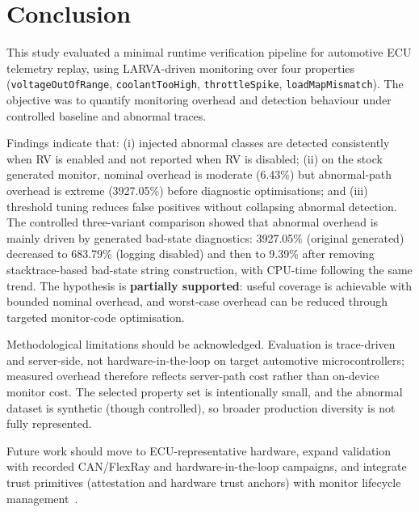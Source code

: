 \section{Conclusion}
\label{sec:Con}

This study evaluated a minimal runtime verification pipeline for automotive ECU telemetry replay, using LARVA-driven monitoring over four properties (\texttt{voltageOutOfRange}, \texttt{coolantTooHigh}, \texttt{throttleSpike}, \texttt{loadMapMismatch}). The objective was to quantify monitoring overhead and detection behaviour under controlled baseline and abnormal traces.

Findings indicate that: (i) injected abnormal classes are detected consistently when RV is enabled and not reported when RV is disabled; (ii) on the stock generated monitor, nominal overhead is moderate (6.43\%) but abnormal-path overhead is extreme (3927.05\%) before diagnostic optimisations; and (iii) threshold tuning reduces false positives without collapsing abnormal detection. The controlled three-variant comparison showed that abnormal overhead is mainly driven by generated bad-state diagnostics: 3927.05\% (original generated) decreased to 683.79\% (logging disabled) and then to 9.39\% after removing stacktrace-based bad-state string construction, with CPU-time following the same trend. The hypothesis is \textbf{partially supported}: useful coverage is achievable with bounded nominal overhead, and worst-case overhead can be reduced through targeted monitor-code optimisation.

Methodological limitations should be acknowledged. Evaluation is trace-driven and server-side, not hardware-in-the-loop on target automotive microcontrollers; measured overhead therefore reflects server-path cost rather than on-device monitor cost. The selected property set is intentionally small, and the abnormal dataset is synthetic (though controlled), so broader production diversity is not fully represented.

Future work should move to ECU-representative hardware, expand validation with recorded CAN/FlexRay and hardware-in-the-loop campaigns, and integrate trust primitives (attestation and hardware trust anchors) with monitor lifecycle management~\cite{ekert2021cybersecurity,plappert2023hta,lorych2024hta}.